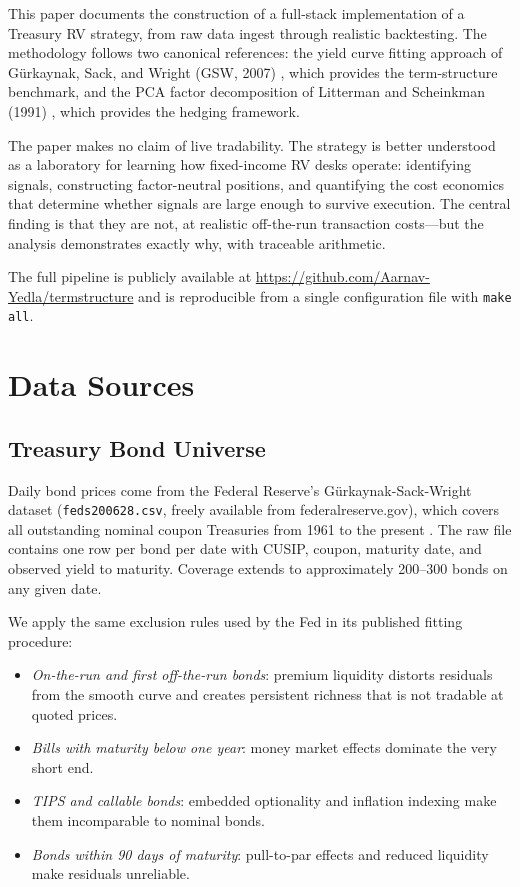 \documentclass[11pt]{article}
\begin{document}
This paper documents the construction of a full-stack implementation of a
Treasury RV strategy, from raw data ingest through realistic backtesting.
The methodology follows two canonical references: the yield curve fitting
approach of G\"urkaynak, Sack, and Wright (GSW, 2007) \cite{gsw2007}, which
provides the term-structure benchmark, and the PCA factor decomposition of
Litterman and Scheinkman (1991) \cite{ls1991}, which provides the hedging
framework.

The paper makes no claim of live tradability. The strategy is better understood
as a laboratory for learning how fixed-income RV desks operate: identifying
signals, constructing factor-neutral positions, and quantifying the cost
economics that determine whether signals are large enough to survive execution.
The central finding is that they are not, at realistic off-the-run transaction
costs---but the analysis demonstrates exactly why, with traceable arithmetic.

The full pipeline is publicly available at
\url{https://github.com/Aarnav-Yedla/termstructure} and is reproducible
from a single configuration file with \texttt{make all}.

\section{Data Sources}

\subsection{Treasury Bond Universe}

Daily bond prices come from the Federal Reserve's Gürkaynak-Sack-Wright dataset
(\texttt{feds200628.csv}, freely available from federalreserve.gov), which
covers all outstanding nominal coupon Treasuries from 1961 to the present
\cite{gsw2007}. The raw file contains one row per bond per date with CUSIP,
coupon, maturity date, and observed yield to maturity. Coverage extends to
approximately 200--300 bonds on any given date.

We apply the same exclusion rules used by the Fed in its published fitting
procedure:
\begin{itemize}\setlength\itemsep{2pt}
  \item \textit{On-the-run and first off-the-run bonds}: premium liquidity
        distorts residuals from the smooth curve and creates persistent
        richness that is not tradable at quoted prices.
  \item \textit{Bills with maturity below one year}: money market effects
        dominate the very short end.
  \item \textit{TIPS and callable bonds}: embedded optionality and inflation
        indexing make them incomparable to nominal bonds.
  \item \textit{Bonds within 90 days of maturity}: pull-to-par effects and
        reduced liquidity make residuals unreliable.
\end{itemize}
\end{document}
